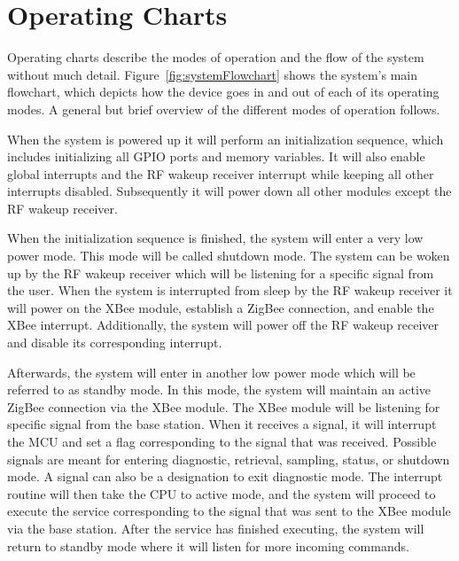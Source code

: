 \section{Operating Charts}
\label{sec:flowCharts}
Operating charts describe the modes of operation and the flow of the system without much detail. Figure~\ref{fig:systemFlowchart} shows the system's main flowchart, which depicts how the device goes in and out of each of its operating modes.  A general but brief overview of the different modes of operation follows.

When the system is powered up it will perform an initialization sequence, which includes initializing all GPIO ports and memory variables. It will also enable global interrupts and the RF wakeup receiver interrupt while keeping all other interrupts disabled. Subsequently it will power down all other modules except the RF wakeup receiver.

When the initialization sequence is finished, the system will enter a very low power mode. This mode will be called shutdown mode. The system can be woken up by the RF wakeup receiver which will be listening for a specific signal from the user. When the system is interrupted from sleep by the RF wakeup receiver it will power on the XBee module, establish a ZigBee connection, and enable the XBee interrupt. Additionally, the system will power off the RF wakeup receiver and disable its corresponding interrupt.

Afterwards, the system will enter in another low power mode which will be referred to as standby mode. In this mode, the system will maintain an active ZigBee connection via the XBee module. The XBee module will be listening for specific signal from the base station. When it receives a signal, it will interrupt the MCU and set a flag corresponding to the signal that was received. Possible signals are meant for entering diagnostic, retrieval, sampling, status, or shutdown mode. A signal can also be a designation to exit diagnostic mode. The interrupt routine will then take the CPU to active mode, and the system will proceed to execute the service corresponding to the signal that was sent to the XBee module via the base station. After the service has finished executing, the system will return to standby mode where it will listen for more incoming commands.

